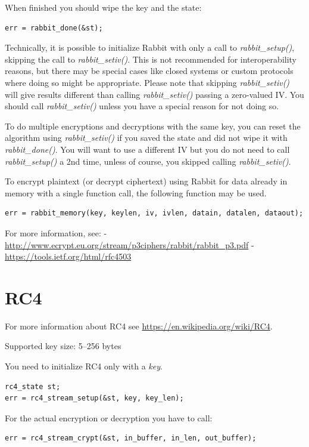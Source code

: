 \documentclass[synpaper]{book}
\newcommand{\mysection}[1]    %
	{                   %
	\section{#1}
   \markboth{\textsf{www.libtom.net}}{\thesection ~ {#1}}
	}
\begin{document}
When finished you should wipe the key and the state:
\begin{verbatim}
err = rabbit_done(&st);
\end{verbatim}

Technically, it is possible to initialize Rabbit with only a call to \textit{rabbit\_setup()},
skipping the call to \textit{rabbit\_setiv()}.  This is not recommended for interoperability reasons,
but there may be special cases like closed systems or custom protocols where doing so might be
appropriate.  Please note that skipping \textit{rabbit\_setiv()} will give results different than
calling \textit{rabbit\_setiv()} passing a zero-valued IV.  You should call \textit{rabbit\_setiv()} unless
you have a special reason for not doing so.

To do multiple encryptions and decryptions with the same key, you can reset the algorithm
using \textit{rabbit\_setiv()} if you saved the state and did not wipe it with \textit{rabbit\_done()}.
You will want to use a different IV but you do not need to call \textit{rabbit\_setup()} a 2nd time,
unless of course, you skipped calling \textit{rabbit\_setiv()}.

To encrypt plaintext (or decrypt ciphertext) using Rabbit for data already in
memory with a single function call, the following function may be used.
\begin{verbatim}
err = rabbit_memory(key, keylen, iv, ivlen, datain, datalen, dataout);
\end{verbatim}

For more information, see: \newline
\hspace{4em}- \url{http://www.ecrypt.eu.org/stream/p3ciphers/rabbit/rabbit_p3.pdf} \newline
\hspace{4em}- \url{https://tools.ietf.org/html/rfc4503}

\mysection{RC4}

For more information about RC4 see \url{https://en.wikipedia.org/wiki/RC4}.

Supported key size: 5--256 bytes

You need to initialize RC4 only with a \textit{key}.
\begin{verbatim}
rc4_state st;
err = rc4_stream_setup(&st, key, key_len);
\end{verbatim}

For the actual encryption or decryption you have to call:
\begin{verbatim}
err = rc4_stream_crypt(&st, in_buffer, in_len, out_buffer);
\end{verbatim}
\end{document}
